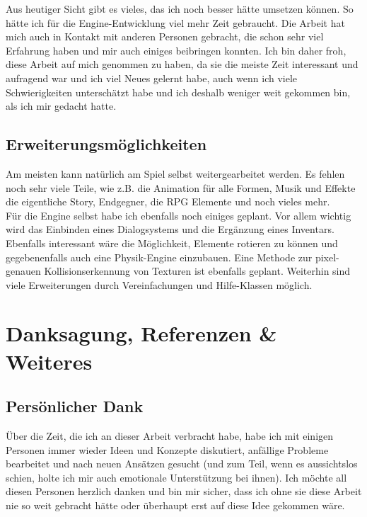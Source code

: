 \documentclass[12pt,a4paper,titlepage]{article}
\begin{document}
		Aus heutiger Sicht gibt es vieles, das ich noch besser hätte umsetzen können. So hätte ich für die Engine-Entwicklung viel mehr Zeit gebraucht. Die Arbeit hat mich auch in Kontakt mit anderen Personen gebracht, die schon sehr viel Erfahrung haben und mir auch einiges beibringen konnten. Ich bin daher froh, diese Arbeit auf mich genommen zu haben, da sie die meiste Zeit interessant und aufragend war und ich viel Neues gelernt habe, auch wenn ich viele Schwierigkeiten unterschätzt habe und ich deshalb weniger weit gekommen bin, als ich mir gedacht hatte.

	\subsection{Erweiterungsmöglichkeiten}
		Am meisten kann natürlich am Spiel selbst weitergearbeitet werden. Es fehlen noch sehr viele Teile, wie z.B. die Animation für alle Formen, Musik und Effekte die eigentliche Story, Endgegner, die RPG Elemente und noch vieles mehr.\\
		
		Für die Engine selbst habe ich ebenfalls noch einiges geplant. Vor allem wichtig wird das Einbinden eines Dialogsystems und die Ergänzung eines Inventars. Ebenfalls interessant wäre die Möglichkeit, Elemente rotieren zu können und gegebenenfalls auch eine Physik-Engine einzubauen. Eine Methode zur pixel-genauen Kollisionserkennung von Texturen ist ebenfalls geplant. Weiterhin sind viele Erweiterungen durch Vereinfachungen und Hilfe-Klassen möglich.\\
		
		
\clearpage
\section{Danksagung, Referenzen \& Weiteres}
	\subsection{Persönlicher Dank}
		Über die Zeit, die ich an dieser Arbeit verbracht habe, habe ich mit einigen Personen immer wieder Ideen und Konzepte diskutiert, anfällige Probleme bearbeitet und nach neuen Ansätzen gesucht (und zum Teil, wenn es aussichtslos schien, holte ich mir auch emotionale Unterstützung bei ihnen).
		Ich möchte all diesen Personen herzlich danken und bin mir sicher, dass ich ohne sie diese Arbeit nie so weit gebracht hätte oder überhaupt erst auf diese Idee gekommen wäre.\\
		
\end{document}
